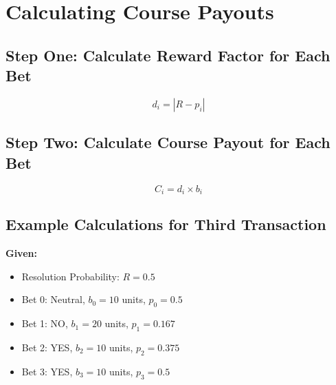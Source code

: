 \documentclass{article}
\begin{document}
\begin{center}

\end{center}


\section*{Calculating Course Payouts}

\subsection*{Step One: Calculate Reward Factor for Each Bet}

\[
d_i = |R - p_i|
\]

\subsection*{Step Two: Calculate Course Payout for Each Bet}

\[
C_i = d_i \times b_i
\]

\subsection*{Example Calculations for Third Transaction}

\textbf{Given:}

\begin{itemize}
  \item Resolution Probability: \( R = 0.5 \)
  \item Bet 0: Neutral, \( b_0 = 10 \) units, \( p_0 = 0.5 \)
  \item Bet 1: NO, \( b_1 = 20 \) units, \( p_1 = 0.167 \)
  \item Bet 2: YES, \( b_2 = 10 \) units, \( p_2 = 0.375 \)
  \item Bet 3: YES, \( b_3 = 10 \) units, \( p_3 = 0.5 \)
\end{itemize}
\end{document}
